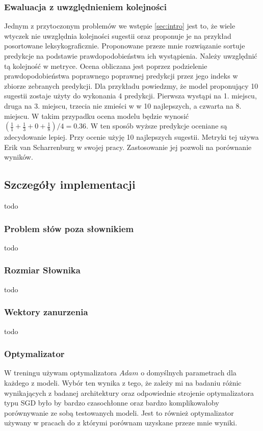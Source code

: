 \subsubsection{Ewaluacja z uwzględnieniem kolejności}
Jednym z przytoczonym problemów we wstępie \ref{sec:intro} jest to, że wiele wtyczek nie uwzględnia kolejności sugestii oraz proponuje je na przykład posortowane leksykograficznie. Proponowane przeze mnie rozwiązanie 
sortuje predykcje na podstawie prawdopodobieństwa ich wystąpienia. Należy uwzględnić tą kolejność w metryce. Ocena obliczana jest poprzez podzielenie prawdopodobieństwa poprawnego poprawnej predykcji przez 
jego indeks w zbiorze zebranych predykcji. Dla przykładu powiedzmy, że model proponujący 10 sugestii zostaje użyty do wykonania 4 predykcji. Pierwsza wystąpi na 1. miejscu, druga na 3. miejscu, trzecia nie zmieści w w 10 najlepszych, 
a czwarta na 8. miejscu. W takim przypadku ocena modelu będzie wynosić \begin{math}(\frac{1}{1}+ \frac{1}{3}+ 0 +\frac{1}{8})/4 = 0.36\end{math}. W ten sposób wyższe predykcje oceniane są zdecydowanie lepiej.
Przy ocenie użyję 10 najlepszych sugestii.  Metryki tej używa Erik van Scharrenburg \cite{erik} w swojej pracy. Zastosowanie jej pozwoli na porównanie wyników. 

\subsection{Szczegóły implementacji}
todo
\subsubsection{Problem słów poza słownikiem}
todo
\subsubsection{Rozmiar Słownika}
todo
\subsubsection{Wektory zanurzenia}
todo
\subsubsection{Optymalizator}
W treningu używam optymalizatora \begin{math}Adam\end{math} o domyślnych parametrach dla każdego z modeli.
Wybór ten wynika z tego, że zależy mi na badaniu różnic wynikających z badanej architektury oraz odpowiednie strojenie optymalizatora typu SGD
było by bardzo czasochłonne oraz bardzo komplikowałoby porównywanie ze sobą testowanych modeli. Jest to również optymalizator używany w pracach 
do z którymi porównam uzyskane przeze mnie wyniki.  

